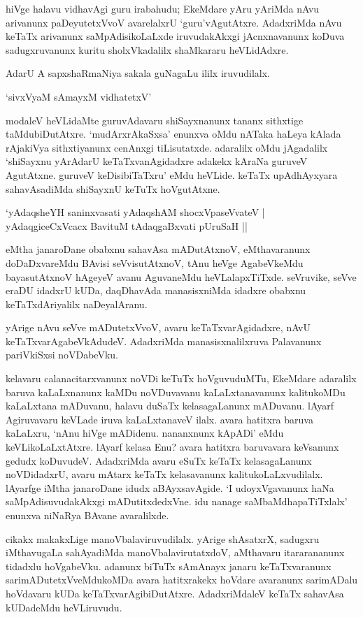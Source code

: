 hiVge halavu vidhavAgi guru irabahudu; EkeMdare yAru yAriMda nAvu arivanunx paDeyutetxVvoV avarelalxrU `guru'vAgutAtxre. AdadxriMda nAvu keTaTx arivanunx saMpAdisikoLaLxde iruvudakAkxgi jAcnxnavanunx koDuva sadugxruvanunx kuritu sholxVkadalilx shaMkararu heVLidAdxre.

AdarU A sapxshaRmaNiya sakala guNagaLu ililx iruvudilalx. 


\begin{shloka}
`sivxVyaM sAmayxM vidhatetxV'
\end{shloka}

modaleV heVLidaMte guruvAdavaru shiSayxnanunx tananx sithxtige taMdubiDutAtxre. `mudArxrAkaSxsa' enunxva oMdu nATaka haLeya kAlada rAjakiVya sithxtiyanunx cenAnxgi tiLisutatxde. adaralilx oMdu jAgadalilx `shiSayxnu yArAdarU keTaTxvanAgidadxre adakekx kAraNa guruveV AgutAtxne. guruveV keDisibiTaTxru' eMdu heVLide. keTaTx upAdhAyxyara sahavAsadiMda shiSayxnU keTuTx hoVgutAtxne.

\begin{shloka}
`yAdaqsheYH saninxvasati yAdaqshAM shocxVpaseVvateV |\\
yAdaqgiceCxVcacx BavituM tAdaqgaBxvati pUruSaH ||
\end{shloka}

\noindent eMtha janaroDane obabxnu sahavAsa mADutAtxnoV, eMthavaranunx doDaDxvareMdu BAvisi seVvisutAtxnoV, tAnu heVge AgabeVkeMdu bayasutAtxnoV hAgeyeV avanu AguvaneMdu heVLalapxTiTxde. seVruvike, seVve eraDU idadxrU kUDa, daqDhavAda manasisxniMda idadxre obabxnu keTaTxdAriyalilx naDeyalAranu. 

yArige nAvu seVve mADutetxVvoV, avaru keTaTxvarAgidadxre, nAvU keTaTxvarAgabeVkAdudeV. AdadxriMda manasisxnalilxruva Palavanunx pariVkiSxsi noVDabeVku.

kelavaru calanacitarxvanunx noVDi keTuTx hoVguvuduMTu, EkeMdare adaralilx baruva kaLaLxnanunx kaMDu noVDuvavanu kaLaLxtanavanunx kalitukoMDu kaLaLxtana mADuvanu, halavu duSaTx kelasagaLanunx mADuvanu. lAyarf Agiruvavaru keVLade iruva kaLaLxtanaveV ilalx. avara hatitxra baruva kaLaLxru, `nAnu hiVge mADidenu. nananxnunx kApADi' eMdu keVLikoLaLxtAtxre. lAyarf kelasa Enu? avara hatitxra baruvavara keVsanunx gedudx koDuvudeV. AdadxriMda avaru eSuTx keTaTx kelasagaLanunx noVDidadxrU, avaru mAtarx keTaTx kelasavanunx kalitukoLaLxvudilalx. lAyarfge iMtha janaroDane idudx aBAyxsavAgide. `I udoyxVgavanunx haNa saMpAdisuvudakAkxgi mADutitxdedxVne. idu nanage saMbaMdhapaTiTxlalx' enunxva niNaRya BAvane avaralilxde. 

cikakx makakxLige manoVbalaviruvudilalx. yArige shAsatxrX, sadugxru iMthavugaLa sahAyadiMda manoVbalavirutatxdoV, aMthavaru itararananunx tidadxlu hoVgabeVku. adanunx biTuTx sAmAnayx janaru keTaTxvaranunx sarimADutetxVveMdukoMDa avara hatitxrakekx hoVdare avaranunx sarimADalu hoVdavaru kUDa keTaTxvarAgibiDutAtxre. AdadxriMdaleV keTaTx sahavAsa kUDadeMdu heVLiruvudu.

